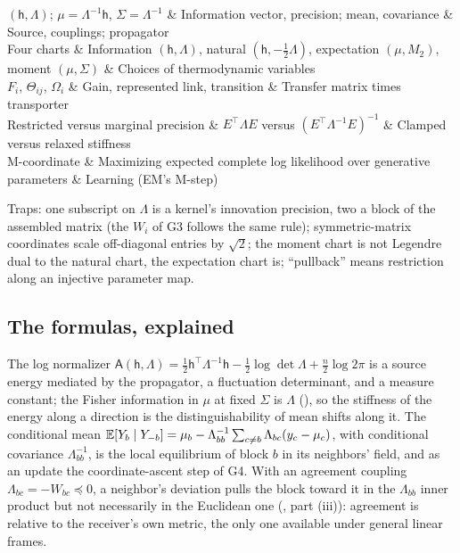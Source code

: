 \begin{decoder}
\((\mathsf h,\Lambda)\); \(\mu=\Lambda^{-1}\mathsf h\), \(\Sigma=\Lambda^{-1}\) & Information vector, precision; mean, covariance & Source, couplings; propagator\\
Four charts & Information \((\mathsf h,\Lambda)\), natural \((\mathsf h,-\tfrac12\Lambda)\), expectation \((\mu,M_2)\), moment \((\mu,\Sigma)\) & Choices of thermodynamic variables\\
\(F_i\), \(\Theta_{ij}\), \(\Omega_i\) & Gain, represented link, transition & Transfer matrix times transporter\\
Restricted versus marginal precision & \(E^\top\Lambda E\) versus \((E^\top\Lambda^{-1}E)^{-1}\) & Clamped versus relaxed stiffness\\
M-coordinate & Maximizing expected complete log likelihood over generative parameters & Learning (EM's M-step)\\
\end{decoder}

Traps: one subscript on \(\Lambda\) is a kernel's innovation precision, two a block of the assembled
matrix (the \(W_i\) of G3 follows the same rule); symmetric-matrix coordinates scale off-diagonal entries
by \(\sqrt2\); the moment chart is not Legendre dual to the natural chart, the expectation chart is;
``pullback'' means restriction along an injective parameter map.

\subsection{The formulas, explained}

The log normalizer
\(\mathsf A(\mathsf h,\Lambda)=\tfrac12\mathsf h^\top\Lambda^{-1}\mathsf h-\tfrac12\log\det\Lambda+\tfrac n2\log2\pi\)
is a source energy mediated by the propagator, a fluctuation determinant, and a measure constant; the
Fisher information in \(\mu\) at fixed \(\Sigma\) is \(\Lambda\) (),
so the stiffness of the energy along a direction is the distinguishability of mean shifts along it. The
conditional mean \(\mathbb E[Y_b\mid Y_{-b}]=\mu_b-\Lambda_{bb}^{-1}\sum_{c\neq b}\Lambda_{bc}(y_c-\mu_c)\),
with conditional covariance \(\Lambda_{bb}^{-1}\), is the local equilibrium of block \(b\) in its
neighbors' field, and as an update the coordinate-ascent step of G4. With an agreement coupling
\(\Lambda_{bc}=-W_{bc}\preceq0\), a neighbor's deviation pulls the block toward it in the \(\Lambda_{bb}\)
inner product but not necessarily in the Euclidean one (, part
(iii)): agreement is relative to the
receiver's own metric, the only one available under general linear frames.

